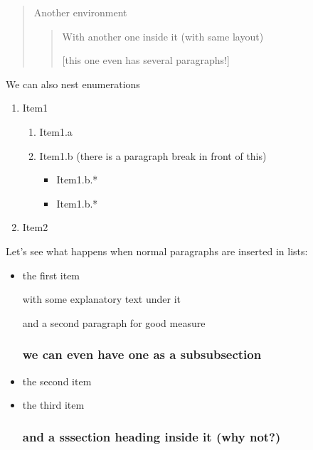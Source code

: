 \documentclass[legalpaper]{article}
\begin{document}
\begin{quotation}
Another environment

\begin{quotation}
With another one inside it (with same layout)

[this one even has several paragraphs!]
\end{quotation}

\end{quotation}

We can also nest enumerations

\begin{enumerate}
\item Item1
\begin{enumerate}
\item Item1.a

\item Item1.b (there is  a paragraph break in front of this)
\begin{itemize}
\item Item1.b.*
\item Item1.b.*
\end{itemize}
\end{enumerate}
\item Item2
\end{enumerate}

Let's see what happens when normal paragraphs are inserted in lists:

\begin{itemize}
\item the first item

with some explanatory text under it

and a second paragraph for good measure

\subsubsection*{we can even have one as a subsubsection}

\item the second item

\item the third item

\subsubsection*{and a sssection heading inside it (why not?)}
\end{itemize}
\end{document}

